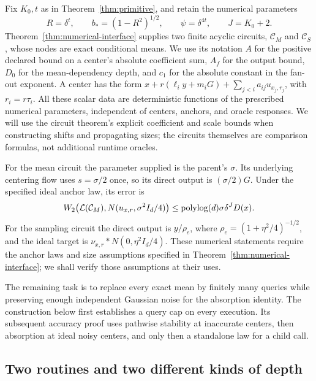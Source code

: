 Fix $K_0,t$ as in Theorem~\ref{thm:primitive}, and retain the
numerical parameters
\[
 R=\delta^t,\qquad b_*=(1-R^2)^{1/2},\qquad
 \psi=\delta^{4t},\qquad J=K_0+2.
\]
Theorem~\ref{thm:numerical-interface} supplies two finite acyclic
circuits, $\mathcal C_M$ and $\mathcal C_S$, whose nodes are exact
conditional means.  We use its notation $A$ for the positive declared
bound on a center's absolute coefficient sum, $A_f$ for the output
bound, $D_0$ for the mean-dependency depth, and $c_1$ for the absolute
constant in the fan-out exponent.  A center has the form
$x+r(\ell_i y+m_iG)+\sum_{j<i}a_{ij}u_{x_j,r_j}$, with
$r_i=r\tau_i$.  All these scalar data are deterministic functions of
the prescribed numerical parameters, independent of centers, anchors,
and oracle responses.  We will use the circuit theorem's explicit
coefficient and scale bounds when constructing shifts and propagating
sizes; the circuits themselves are comparison formulas, not additional
runtime oracles.

For the mean circuit the parameter supplied is the parent's
$\sigma$.  Its underlying centering flow uses $s=\sigma/2$ once,
so its direct output is $(\sigma/2)G$.  Under the specified ideal
anchor law, its error is
\[
 W_2\bigl(\mathcal L(\mathcal C_M),N(u_{x,r},\sigma^2I_d/4)\bigr)
 \le\operatorname{polylog}(d)\sigma\delta^JD(x).
\]
For the sampling circuit the direct
output is $y/\rho_e$, where
$\rho_e=(1+\eta^2/4)^{-1/2}$, and the ideal target is
$\nu_{x,r}*N(0,\eta^2I_d/4)$.  These numerical statements require
the anchor laws and size assumptions specified in
Theorem~\ref{thm:numerical-interface}; we shall verify those assumptions
at their uses.

The remaining task is to replace every exact mean by finitely many
queries while preserving enough independent Gaussian noise for the
absorption identity.  The construction below first establishes a
query cap on every execution.  Its subsequent accuracy proof uses
pathwise stability at inaccurate centers, then absorption at ideal
noisy centers, and only then a standalone law for a child call.

\subsection{Two routines and two different kinds of depth}

